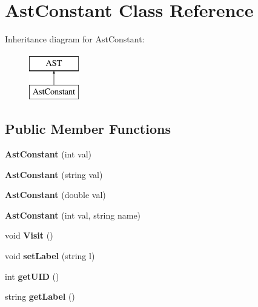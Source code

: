 \hypertarget{classAstConstant}{\section{Ast\-Constant Class Reference}
\label{classAstConstant}
}
Inheritance diagram for Ast\-Constant\-:\begin{figure}[H]
\begin{center}
\leavevmode
\includegraphics[height=2.000000cm]{classAstConstant}
\end{center}
\end{figure}
\subsection*{Public Member Functions}
\begin{DoxyCompactItemize}
\item 
\hypertarget{classAstConstant_ab3d7bb141b6d2650498569fa7742237f}{{\bfseries Ast\-Constant} (int val)}\label{classAstConstant_ab3d7bb141b6d2650498569fa7742237f}

\item 
\hypertarget{classAstConstant_a071adbaa9ea9ad30cde38d68b4182cd9}{{\bfseries Ast\-Constant} (string val)}\label{classAstConstant_a071adbaa9ea9ad30cde38d68b4182cd9}

\item 
\hypertarget{classAstConstant_aef9142c2750c7ad8e83183c7b8ade0e8}{{\bfseries Ast\-Constant} (double val)}\label{classAstConstant_aef9142c2750c7ad8e83183c7b8ade0e8}

\item 
\hypertarget{classAstConstant_a48d0d8e935494c6483cbd7a7a11ab3b9}{{\bfseries Ast\-Constant} (int val, string name)}\label{classAstConstant_a48d0d8e935494c6483cbd7a7a11ab3b9}

\item 
\hypertarget{classAstConstant_ac13b7246f9d646a5ff00efee4c39bc6b}{void {\bfseries Visit} ()}\label{classAstConstant_ac13b7246f9d646a5ff00efee4c39bc6b}

\item 
\hypertarget{classAST_a71d680856e95ff89f55d5311a552eba6}{void {\bfseries set\-Label} (string l)}\label{classAST_a71d680856e95ff89f55d5311a552eba6}

\item 
\hypertarget{classAST_ab7a5b1d9f1c2de0d98deb356f724a42c}{int {\bfseries get\-U\-I\-D} ()}\label{classAST_ab7a5b1d9f1c2de0d98deb356f724a42c}

\item 
\hypertarget{classAST_aee029be902fffc927d16ccb03eb922ad}{string {\bfseries get\-Label} ()}\label{classAST_aee029be902fffc927d16ccb03eb922ad}

\end{DoxyCompactItemize}
